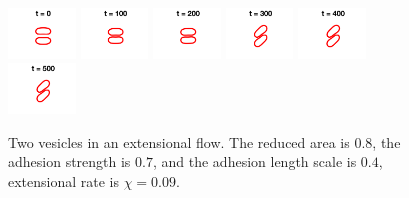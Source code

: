 \documentclass[%
preprint,
 amsmath,amssymb,
 aps,
]{revtex4-1}
\begin{document}
\begin{figure}[htp]
  \includegraphics[width = 0.16\textwidth]{figs/extensional_adR4em1adS7em1Chi9em2_ra080_image01.png}
  \includegraphics[width = 0.16\textwidth]{figs/extensional_adR4em1adS7em1Chi9em2_ra080_image02.png}
  \includegraphics[width = 0.16\textwidth]{figs/extensional_adR4em1adS7em1Chi9em2_ra080_image03.png}
  \includegraphics[width = 0.16\textwidth]{figs/extensional_adR4em1adS7em1Chi9em2_ra080_image04.png}
  \includegraphics[width = 0.16\textwidth]{figs/extensional_adR4em1adS7em1Chi9em2_ra080_image05.png}
  \includegraphics[width = 0.16\textwidth]{figs/extensional_adR4em1adS7em1Chi9em2_ra080_image06.png}
  \caption{Two vesicles in an extensional flow.  The reduced area is
  $0.8$, the adhesion strength is $0.7$, and the adhesion length scale
is $0.4$, extensional rate is $\chi = 0.09$.}
\end{figure}
\end{document}

